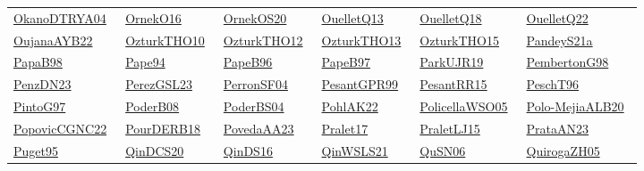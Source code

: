 \begin{longtable}{*{6}{l}}
\href{../}{OkanoDTRYA04}~\cite{OkanoDTRYA04} & \href{../works/OrnekO16.pdf}{OrnekO16}~\cite{OrnekO16} & \href{../works/OrnekOS20.pdf}{OrnekOS20}~\cite{OrnekOS20} & \href{../works/OuelletQ13.pdf}{OuelletQ13}~\cite{OuelletQ13} & \href{../works/OuelletQ18.pdf}{OuelletQ18}~\cite{OuelletQ18} & \href{../works/OuelletQ22.pdf}{OuelletQ22}~\cite{OuelletQ22}\\ 
\href{../works/OujanaAYB22.pdf}{OujanaAYB22}~\cite{OujanaAYB22} & \href{../works/OzturkTHO10.pdf}{OzturkTHO10}~\cite{OzturkTHO10} & \href{../works/OzturkTHO12.pdf}{OzturkTHO12}~\cite{OzturkTHO12} & \href{../works/OzturkTHO13.pdf}{OzturkTHO13}~\cite{OzturkTHO13} & \href{../works/OzturkTHO15.pdf}{OzturkTHO15}~\cite{OzturkTHO15} & \href{../works/PandeyS21a.pdf}{PandeyS21a}~\cite{PandeyS21a}\\ 
\href{../works/PapaB98.pdf}{PapaB98}~\cite{PapaB98} & \href{../works/Pape94.pdf}{Pape94}~\cite{Pape94} & \href{../}{PapeB96}~\cite{PapeB96} & \href{../}{PapeB97}~\cite{PapeB97} & \href{../works/ParkUJR19.pdf}{ParkUJR19}~\cite{ParkUJR19} & \href{../works/PembertonG98.pdf}{PembertonG98}~\cite{PembertonG98}\\ 
\href{../works/PenzDN23.pdf}{PenzDN23}~\cite{PenzDN23} & \href{../works/PerezGSL23.pdf}{PerezGSL23}~\cite{PerezGSL23} & \href{../works/PerronSF04.pdf}{PerronSF04}~\cite{PerronSF04} & \href{../works/PesantGPR99.pdf}{PesantGPR99}~\cite{PesantGPR99} & \href{../works/PesantRR15.pdf}{PesantRR15}~\cite{PesantRR15} & \href{../}{PeschT96}~\cite{PeschT96}\\ 
\href{../}{PintoG97}~\cite{PintoG97} & \href{../works/PoderB08.pdf}{PoderB08}~\cite{PoderB08} & \href{../works/PoderBS04.pdf}{PoderBS04}~\cite{PoderBS04} & \href{../works/PohlAK22.pdf}{PohlAK22}~\cite{PohlAK22} & \href{../works/PolicellaWSO05.pdf}{PolicellaWSO05}~\cite{PolicellaWSO05} & \href{../works/Polo-MejiaALB20.pdf}{Polo-MejiaALB20}~\cite{Polo-MejiaALB20}\\ 
\href{../works/PopovicCGNC22.pdf}{PopovicCGNC22}~\cite{PopovicCGNC22} & \href{../works/PourDERB18.pdf}{PourDERB18}~\cite{PourDERB18} & \href{../works/PovedaAA23.pdf}{PovedaAA23}~\cite{PovedaAA23} & \href{../works/Pralet17.pdf}{Pralet17}~\cite{Pralet17} & \href{../works/PraletLJ15.pdf}{PraletLJ15}~\cite{PraletLJ15} & \href{../works/PrataAN23.pdf}{PrataAN23}~\cite{PrataAN23}\\ 
\href{../works/Puget95.pdf}{Puget95}~\cite{Puget95} & \href{../works/QinDCS20.pdf}{QinDCS20}~\cite{QinDCS20} & \href{../works/QinDS16.pdf}{QinDS16}~\cite{QinDS16} & \href{../works/QinWSLS21.pdf}{QinWSLS21}~\cite{QinWSLS21} & \href{../works/QuSN06.pdf}{QuSN06}~\cite{QuSN06} & \href{../works/QuirogaZH05.pdf}{QuirogaZH05}~\cite{QuirogaZH05}\\ 

\end{longtable}
